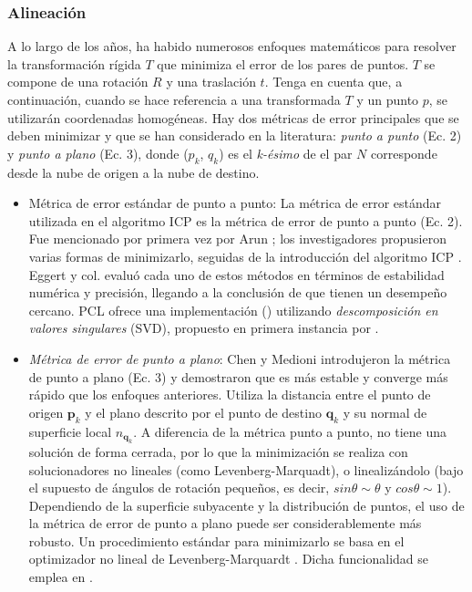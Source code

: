 \subsubsection{Alineación}
A lo largo de los años, ha habido numerosos enfoques matemáticos para resolver la transformación rígida $T$ que minimiza el error de los pares de puntos. $T$ se compone de una rotación $R$ y una traslación $t$. Tenga en cuenta que, a continuación, cuando se hace referencia a una transformada $T$ y un punto $p$, se utilizarán coordenadas homogéneas. Hay dos métricas de error principales que se deben minimizar y que se han considerado en la literatura: \textit{punto a punto} (Ec. 2) y \textit{punto a plano} (Ec. 3), donde ($p_k$, $q_k$) es el \textit{k-ésimo} de el par $N$ corresponde desde la nube de origen a la nube de destino.
\begin{itemize}
    \item Métrica de error estándar de punto a punto: La métrica de error estándar utilizada en el algoritmo ICP es la métrica de error de punto a punto (Ec. 2). Fue mencionado por primera vez por Arun \cite{arun1987}; los investigadores propusieron varias formas de minimizarlo, seguidas de la introducción del algoritmo ICP \cite{besl1992}. Eggert y col. \cite{eggert1997} evaluó cada uno de estos métodos en términos de estabilidad numérica y precisión, llegando a la conclusión de que tienen un desempeño cercano. PCL ofrece una implementación () utilizando \textit{descomposición en valores singulares} (SVD), propuesto en primera instancia por \cite{horn1987}.
    \item \textit{Métrica de error de punto a plano}: Chen y Medioni \cite{chen1992} introdujeron la métrica de punto a plano (Ec. 3) y demostraron que es más estable y converge más rápido que los enfoques anteriores. Utiliza la distancia entre el punto de origen $\bm{p}_k$ y el plano descrito por el punto de destino $\bm{q}_k$ y su normal de superficie local $n_{\bm{q}_k}$. A diferencia de la métrica punto a punto, no tiene una solución de forma cerrada, por lo que la minimización se realiza con solucionadores no lineales (como Levenberg-Marquadt), o linealizándolo \cite{low2004} (bajo el supuesto de ángulos de rotación pequeños, es decir, $sin \theta \sim \theta$ y $cos \theta \sim 1$). Dependiendo de la superficie subyacente y la distribución de puntos, el uso de la métrica de error de punto a plano puede ser considerablemente más robusto. Un procedimiento estándar para minimizarlo se basa en el optimizador no lineal de Levenberg-Marquardt \cite{fitzgibbon2001}. Dicha funcionalidad se emplea en .

\end{itemize}

